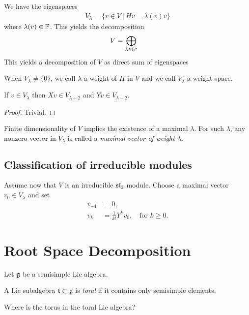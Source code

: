 We have the eigenspaces
\begin{align}
    V_\lambda = \{v\in V\ |\ H v = \lambda(v) v\}
\end{align}
where $\lambda(v)\in \mathbb{F}$. This yields the decomposition
\begin{align}
    V &= \bigoplus_{\lambda\in \mathfrak{h}^*} 
\end{align}
This yields a decomposition of $V$ as direct sum of eigenspaces 

When $V_\lambda \neq \{0\}$, we call $\lambda$ a weight of $H$ in $V$ and we call $V_\lambda$ a weight space.

\begin{lemma}
    If $v\in V_\lambda$ then $Xv \in V_{\lambda + 2}$ and $Yv\in V_{\lambda-2}$.
\end{lemma}
\begin{proof} Trivial.
\end{proof}
Finite dimensionality of $V$ implies the existence of a maximal $\lambda$. For such $\lambda$, any nonzero vector in $V_\lambda$ is called a \emph{maximal vector of weight $\lambda$}.

\subsection{Classification of irreducible modules}
\label{sub:classification_of_irreducible_modules}

Assume now that $V$ is an irreducible $\mathfrak{sl}_2$ module. Choose a maximal vector $v_0\in V_\lambda$ and set
\begin{align}
    v_{-1}&=0, \\
    v_k &= \frac{1}{k!} Y^k v_0, \quad\text{for } k\geq 0.
\end{align}


\section{Root Space Decomposition}
\label{sec:root_space_decomposition}

Let $\mathfrak{g}$ be a semisimple Lie algebra.

\begin{definition}
    A Lie subalgebra $\Lie t \subset \Lie g$ is \emph{toral} if it contains only semisimple elements.
\end{definition}

\begin{insight}
    Where is the torus in the toral Lie algebra? 
\end{insight}

